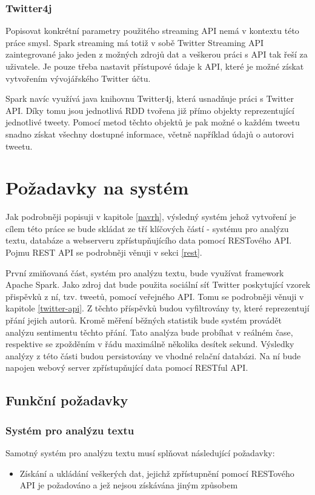 \documentclass[thesis=B,czech]{FITthesis}[2012/06/26]
\begin{document}
\subsubsection{Twitter4j}
	Popisovat konkrétní parametry použitého streaming API nemá v kontextu této práce smysl. Spark streaming má totiž v sobě Twitter Streaming API zaintegrované jako jeden z možných zdrojů dat a veškerou práci s API tak řeší za uživatele. Je pouze třeba nastavit přístupové údaje k API, které je možné získat vytvořením vývojářského Twitter účtu. 
	
	Spark navíc využívá java knihovnu Twitter4j\cite{twitter4j}, která usnadňuje práci s Twitter API. Díky tomu jsou jednotlivá RDD tvořena již přímo objekty reprezentující jednotlivé tweety. Pomocí metod těchto objektů je pak možné o každém tweetu snadno získat všechny dostupné informace, včetně například údajů o autorovi tweetu. 


\section{Požadavky na systém}
\label{pozadavky}
	Jak podrobněji popisuji v kapitole \ref{navrh}, výsledný systém jehož vytvoření je cílem této práce se bude skládat ze tří klíčových částí - systému pro analýzu textu, databáze a webserveru zpřístupňujícího data pomocí RESTového API. Pojmu REST API se podrobněji věnuji v sekci \ref{rest}. 
	
	 První zmiňovaná část, systém pro analýzu textu, bude využívat framework Apache Spark. Jako zdroj dat bude použita sociální síť Twitter poskytující vzorek přispěvků z ní, tzv. tweetů, pomocí veřejného API. Tomu se podrobněji věnuji v kapitole \ref{twitter-api}. Z těchto příspěvků budou vyfiltrovány ty, které reprezentují přání jejich autorů. Kromě měření běžných statistik bude systém provádět analýzu sentimentu těchto přání. Tato analýza bude probíhat v reálném čase, respektive se zpožděním v řádu maximálně několika desítek sekund.  Výsledky analýzy z této části budou persistovány ve vhodné relační databázi. Na ní bude napojen webový server zpřístupňující data pomocí RESTful API. 

\subsection{Funkční požadavky}
\subsubsection{Systém pro analýzu textu}
Samotný systém pro analýzu textu musí splňovat následující požadavky:
\begin{itemize}
\item Získání a ukládání veškerých dat, jejichž zpřístupnění pomocí RESTového API je požadováno a jež nejsou získávána jiným způsobem
\end{itemize}
\end{document}
